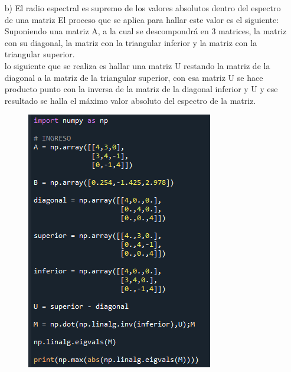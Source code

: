 \documentclass[10pt,letterpaper]{article}
\begin{document}
	\begin{center}
	
		\begin{enumerate}
		
			\item[b)] El radio espectral es supremo de los valores absolutos dentro del espectro de una matriz
El proceso que se aplica para hallar este valor es el siguiente:\\
Suponiendo una matriz A, a la cual se descompondrá en 3 matrices, la matriz con su diagonal, la matriz con la triangular inferior y la matriz con la triangular superior.\\
lo siguiente que se realiza es hallar una matriz U restando la matriz de la diagonal a la matriz de la triangular superior, con esa matriz U se hace producto punto con la inversa de la matriz de la diagonal inferior y U y ese resultado se halla el máximo valor absoluto del espectro de la matriz.\\
			\begin{figure}[H]
				\includegraphics{imagen1}
				\centering
			\end{figure}
			

\end{enumerate}
\end{center}
\end{document}

